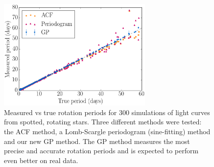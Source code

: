 \documentclass{iau_FM}
\begin{document}
\begin{figure}[b]
\begin{center}
	\includegraphics[width=3in,trim={0 1.2cm 0 1.2cm},clip]{compare2.eps}
 \caption{Measured vs true rotation periods for 300 simulations of light curves
	 from spotted, rotating stars.
	 Three different methods were tested: the ACF method, a Lomb-Scargle
	 periodogram (sine-fitting) method and our new GP method.
	 The GP method measures the most precise and accurate rotation periods
	 and is expected to perform even better on real data.}
   \label{fig1}
\end{center}
\end{figure}





\end{document}
